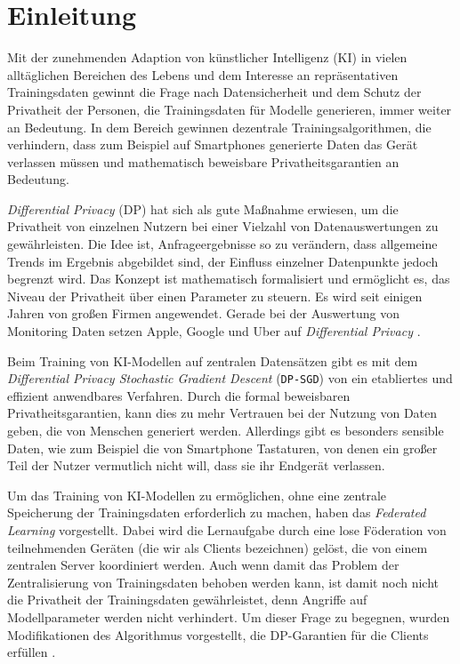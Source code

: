 \chapter{Einleitung}

Mit der zunehmenden Adaption von künstlicher Intelligenz (KI) in vielen alltäglichen Bereichen des Lebens und dem Interesse an repräsentativen Trainingsdaten gewinnt die Frage nach Datensicherheit und dem Schutz der Privatheit der Personen, die Trainingsdaten für Modelle generieren, immer weiter an Bedeutung. In dem Bereich gewinnen dezentrale Trainingsalgorithmen, die verhindern, dass zum Beispiel auf Smartphones generierte Daten das Gerät verlassen müssen und mathematisch beweisbare Privatheitsgarantien an Bedeutung.

\textit{Differential Privacy} (DP) hat sich als gute Maßnahme erwiesen, um die Privatheit von einzelnen Nutzern bei einer Vielzahl von Datenauswertungen zu gewährleisten. Die Idee ist, Anfrageergebnisse so zu verändern, dass allgemeine Trends im Ergebnis abgebildet sind, der Einfluss einzelner Datenpunkte jedoch begrenzt wird. Das Konzept ist mathematisch formalisiert und ermöglicht es, das Niveau der Privatheit über einen Parameter zu steuern. Es wird seit einigen Jahren von großen Firmen angewendet. Gerade bei der Auswertung von Monitoring Daten setzen Apple, Google und Uber auf \textit{Differential Privacy} \parencite{apple:2017, erlingsson:2014, tezapsidis:2017}. 

Beim Training von KI-Modellen auf zentralen Datensätzen gibt es mit dem \textit{Differential Privacy Stochastic Gradient Descent} (\texttt{DP-SGD}) von \textcite{abadi:2016} ein etabliertes und effizient anwendbares Verfahren. Durch die formal beweisbaren Privatheitsgarantien, kann dies zu mehr Vertrauen bei der Nutzung von Daten geben, die von Menschen generiert werden. Allerdings gibt es besonders sensible Daten, wie zum Beispiel die von Smartphone Tastaturen, von denen ein großer Teil der Nutzer vermutlich nicht will, dass sie ihr Endgerät verlassen.

Um das Training von KI-Modellen zu ermöglichen, ohne eine zentrale Speicherung der Trainingsdaten erforderlich zu machen, haben \textcite{mcmahan:2016} das \textit{Federated Learning} vorgestellt. Dabei wird \glqq{}die Lernaufgabe durch eine lose Föderation von teilnehmenden Geräten (die wir als Clients bezeichnen) gelöst, die von einem zentralen Server koordiniert werden.\grqq{} \parencite[p.1]{mcmahan:2016} Auch wenn damit das Problem der Zentralisierung von Trainingsdaten behoben werden kann, ist damit noch nicht die Privatheit der Trainingsdaten gewährleistet, denn Angriffe auf Modellparameter werden nicht verhindert. Um dieser Frage zu begegnen, wurden Modifikationen des Algorithmus vorgestellt, die DP-Garantien für die Clients erfüllen \parencite{mcmahan:2018, geyer:2017}.

